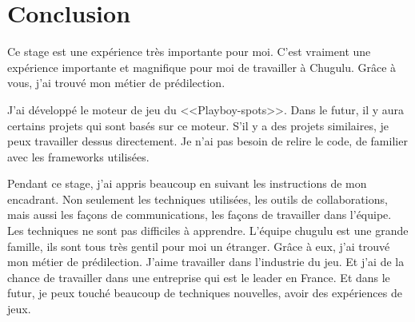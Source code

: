 \chapter{Conclusion}

Ce stage est une expérience très importante pour moi. C’est vraiment une expérience importante et magnifique pour moi de travailler à Chugulu. Grâce à vous, j’ai trouvé mon métier de prédilection.

J’ai développé le moteur de jeu du <<Playboy-spots>>. Dans le futur, il y aura certains projets qui sont basés sur ce moteur. S'il y a des projets similaires, je peux travailler dessus directement. Je n’ai pas besoin de relire le code, de familier avec les frameworks utilisées. 

Pendant ce stage, j’ai appris beaucoup en suivant les instructions de mon encadrant. Non seulement les techniques utilisées, les outils de collaborations, mais aussi les façons de communications, les façons de travailler dans l’équipe.  Les techniques ne sont pas difficiles à apprendre. L’équipe chugulu est une grande famille, ils sont tous très gentil pour moi un étranger. Grâce à eux, j’ai trouvé mon métier de prédilection. J’aime travailler dans l’industrie du jeu. Et j’ai de la chance de travailler dans une entreprise qui est le leader en France. Et dans le futur, je peux touché beaucoup de techniques nouvelles, avoir des expériences de jeux.

